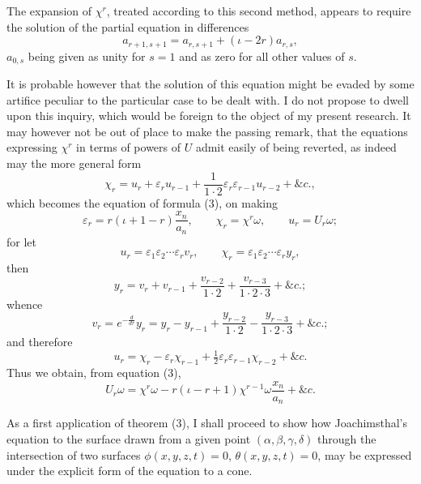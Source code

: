 \documentclass[11pt]{article}
\newcommand{\eps}{\varepsilon}
\begin{document}
{{The expansion of $\chi^r$, treated according to this second method, appears to require the solution of the partial equation in differences
\[
 a_{r+1,s+1}=a_{r,s+1}+(\iota-2r)a_{r,s},
\]
$a_{0,s}$ being given as unity for $s=1$ and as zero for all other values of $s$.

It is probable however that the solution of this equation might be evaded by some artifice peculiar to the particular case to be dealt with. I do not propose to dwell upon this inquiry, which would be foreign to the object of my present research. It may however not be out of place to make the passing remark, that the equations expressing $\chi^r$ in terms of powers of $U$ admit easily of being reverted, as indeed may the more general form
\[
 \chi_r=u_r+\eps_r u_{r-1}+\frac{1}{1\cdot2}\eps_r\eps_{r-1}u_{r-2}+\&c.,
\]
which becomes the equation of formula (3), on making
\[
 \eps_r=r(\iota+1-r)\frac{x_n}{a_n},\qquad \chi_r=\chi^r\omega,
 \qquad u_r=U_r\omega;
\]
for let
\[
 u_r=\eps_1\eps_2\cdots\eps_r v_r,
 \qquad
 \chi_r=\eps_1\eps_2\cdots\eps_r y_r,
\]
then
\[
 y_r=v_r+v_{r-1}+\frac{v_{r-2}}{1\cdot2}+\frac{v_{r-3}}{1\cdot2\cdot3}+\&c.;
\]
whence
\[
 v_r=e^{-\frac{d}{dr}}y_r
 =y_r-y_{r-1}+\frac{y_{r-2}}{1\cdot2}-\frac{y_{r-3}}{1\cdot2\cdot3}+\&c.;
\]
and therefore
\[
 u_r=\chi_r-\eps_r\chi_{r-1}+\tfrac12\eps_r\eps_{r-1}\chi_{r-2}+\&c.
\]
Thus we obtain, from equation (3),
\[
 U_r\omega=\chi^r\omega-r(\iota-r+1)\chi^{r-1}\omega\frac{x_n}{a_n}+\&c.
\]

As a first application of theorem (3), I shall proceed to show how Joachimsthal's equation to the surface drawn from a given point $(\alpha,\beta,\gamma,\delta)$ through the intersection of two surfaces $\phi(x,y,z,t)=0$, $\theta(x,y,z,t)=0$, may be expressed under the explicit form of the equation to a cone.

}}
\end{document}

